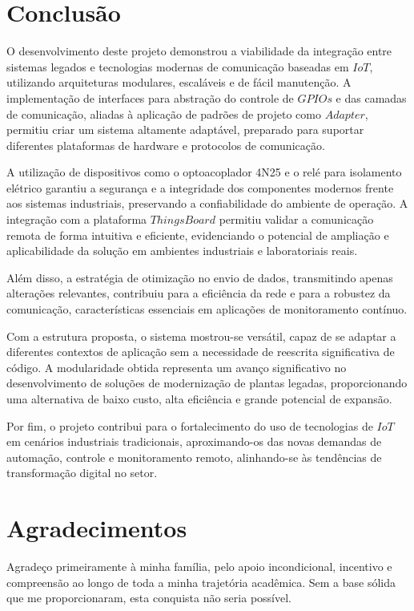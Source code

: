 \documentclass{ecatfg}
\begin{document}
\section{Conclusão}
O desenvolvimento deste projeto demonstrou a viabilidade da integração entre sistemas legados e tecnologias modernas de comunicação baseadas em $IoT$, utilizando arquiteturas modulares, escaláveis e de fácil manutenção. A implementação de interfaces para abstração do controle de $GPIOs$ e das camadas de comunicação, aliadas à aplicação de padrões de projeto como $Adapter$, permitiu criar um sistema altamente adaptável, preparado para suportar diferentes plataformas de hardware e protocolos de comunicação.\par

A utilização de dispositivos como o optoacoplador 4N25 e o relé para isolamento elétrico garantiu a segurança e a integridade dos componentes modernos frente aos sistemas industriais, preservando a confiabilidade do ambiente de operação. A integração com a plataforma $ThingsBoard$ permitiu validar a comunicação remota de forma intuitiva e eficiente, evidenciando o potencial de ampliação e aplicabilidade da solução em ambientes industriais e laboratoriais reais.\par

Além disso, a estratégia de otimização no envio de dados, transmitindo apenas alterações relevantes, contribuiu para a eficiência da rede e para a robustez da comunicação, características essenciais em aplicações de monitoramento contínuo.\par

Com a estrutura proposta, o sistema mostrou-se versátil, capaz de se adaptar a diferentes contextos de aplicação sem a necessidade de reescrita significativa de código. A modularidade obtida representa um avanço significativo no desenvolvimento de soluções de modernização de plantas legadas, proporcionando uma alternativa de baixo custo, alta eficiência e grande potencial de expansão.\par

Por fim, o projeto contribui para o fortalecimento do uso de tecnologias de $IoT$ em cenários industriais tradicionais, aproximando-os das novas demandas de automação, controle e monitoramento remoto, alinhando-se às tendências de transformação digital no setor.\par
	
\section{Agradecimentos}
Agradeço primeiramente à minha família, pelo apoio incondicional, incentivo e compreensão ao longo de toda a minha trajetória acadêmica. Sem a base sólida que me proporcionaram, esta conquista não seria possível. \par
\end{document}
